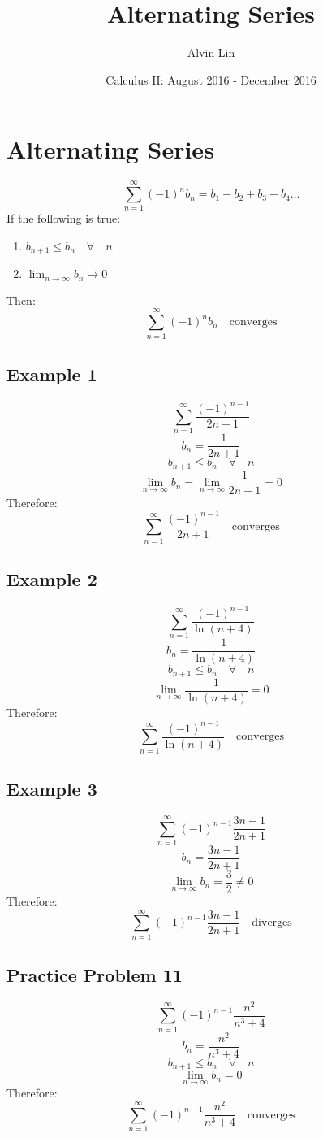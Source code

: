 \documentclass{math}
\title{Alternating Series}
\author{Alvin Lin}
\date{Calculus II: August 2016 - December 2016}
\begin{document}
\maketitle

\section*{Alternating Series}
\[ \sum_{n=1}^{\infty}(-1)^{n}b_{n} = b_{1}-b_{2}+b_{3}-b_{4}... \]
If the following is true:
\begin{enumerate}
  \item \( b_{n+1} \leq b_{n} \quad \forall \quad n \)
  \item \( \lim_{n\to\infty}b_{n} \to 0 \)
\end{enumerate}
Then:
\[ \sum_{n=1}^{\infty}(-1)^{n}b_{n} \quad \mathrm{converges} \]

\subsection*{Example 1}
\[ \sum_{n=1}^{\infty}\frac{(-1)^{n-1}}{2n+1} \]
\[ b_{n} = \frac{1}{2n+1} \]
\[ b_{n+1} \leq b_{n} \quad \forall \quad n \]
\[ \lim_{n\to\infty}b_{n} = \lim_{n\to\infty}\frac{1}{2n+1} = 0 \]
Therefore:
\[ \sum_{n=1}^{\infty}\frac{(-1)^{n-1}}{2n+1} \quad \mathrm{converges} \]

\subsection*{Example 2}
\[ \sum_{n=1}^{\infty}\frac{(-1)^{n-1}}{\ln(n+4)} \]
\[ b_{n} = \frac{1}{\ln(n+4)} \]
\[ b_{n+1} \leq b_{n} \quad \forall \quad n \]
\[ \lim_{n\to\infty}\frac{1}{\ln(n+4)} = 0 \]
Therefore:
\[ \sum_{n=1}^{\infty}\frac{(-1)^{n-1}}{\ln(n+4)} \quad \mathrm{converges} \]

\subsection*{Example 3}
\[ \sum_{n=1}^{\infty}(-1)^{n-1}\frac{3n-1}{2n+1} \]
\[ b_{n} = \frac{3n-1}{2n+1} \]
\[ \lim_{n\to\infty}b_{n} = \frac{3}{2} \neq 0 \]
Therefore:
\[ \sum_{n=1}^{\infty}(-1)^{n-1}\frac{3n-1}{2n+1} \quad \mathrm{diverges} \]

\subsection*{Practice Problem 11}
\[ \sum_{n=1}^{\infty}(-1)^{n-1}\frac{n^{2}}{n^{3}+4} \]
\[ b_{n} = \frac{n^{2}}{n^{3}+4} \]
\[ b_{n+1} \leq b_{n} \quad \forall \quad n \]
\[ \lim_{n\to\infty}b_{n} = 0 \]
Therefore:
\[ \sum_{n=1}^{\infty}(-1)^{n-1}\frac{n^{2}}{n^{3}+4} \quad
   \mathrm{converges} \]
\end{document}
